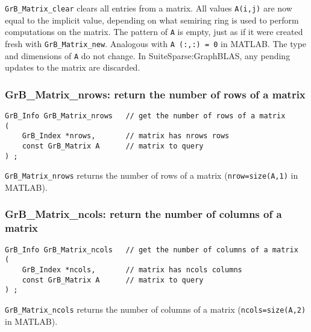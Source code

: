 \documentclass[12pt]{article}
\begin{document}
\verb'GrB_Matrix_clear' clears all entries from a matrix.  All values
\verb'A(i,j)' are now equal to the implicit value, depending on what semiring
ring is used to perform computations on the matrix.  The pattern of \verb'A' is
empty, just as if it were created fresh with \verb'GrB_Matrix_new'.  Analogous
with \verb'A (:,:) = 0' in MATLAB.  The type and dimensions of \verb'A' do not
change.  In SuiteSparse:Graph\-BLAS, any pending updates to the matrix are
discarded.

\subsubsection{{\sf GrB\_Matrix\_nrows:}        return the number of rows of a matrix}
\label{matrix_nrows}

\begin{mdframed}[userdefinedwidth=6in]
{\footnotesize
\begin{verbatim}
GrB_Info GrB_Matrix_nrows   // get the number of rows of a matrix
(
    GrB_Index *nrows,       // matrix has nrows rows
    const GrB_Matrix A      // matrix to query
) ;
\end{verbatim} } \end{mdframed}

\verb'GrB_Matrix_nrows' returns the number of rows of a matrix
(\verb'nrow=size(A,1)' in MATLAB).

\subsubsection{{\sf GrB\_Matrix\_ncols:}        return the number of columns of a matrix}
\label{matrix_ncols}

\begin{mdframed}[userdefinedwidth=6in]
{\footnotesize
\begin{verbatim}
GrB_Info GrB_Matrix_ncols   // get the number of columns of a matrix
(
    GrB_Index *ncols,       // matrix has ncols columns
    const GrB_Matrix A      // matrix to query
) ;
\end{verbatim}
} \end{mdframed}

\verb'GrB_Matrix_ncols' returns the number of columns of a matrix
(\verb'ncols=size(A,2)' in MATLAB).
\end{document}
